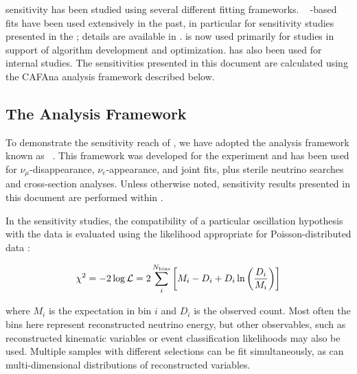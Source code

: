  sensitivity has been studied using several different fitting frameworks. ~\cite{Huber:2004ka,Huber:2007ji} 
-based fits have been used extensively in the past, in particular for sensitivity studies presented in the  ; details are available in \cite{Acciarri:2015uup,Alion:2016uaj,Bass:2014vta}.  is now used primarily for studies in support of algorithm development and optimization. \cite{valorweb} has also been used for internal studies.  The sensitivities presented in this document are calculated using the CAFAna analysis framework described below. 



\subsection{The  Analysis Framework}
\label{sect:methods-cafana}

To demonstrate the sensitivity reach of , we have adopted the analysis framework known as ~\cite{CAFAna}. This framework was developed for the  experiment and has been used for $\nu_\mu$-disappearance, $\nu_e$-appearance, and joint fits, plus sterile neutrino searches and cross-section analyses.  Unless otherwise noted, sensitivity results presented in this document are performed within . %

In the sensitivity studies, the compatibility of a particular oscillation hypothesis with the data is evaluated using the likelihood appropriate for Poisson-distributed data \cite{Tanabashi:2018oca}:

\begin{equation}
    \chi^2 = -2\log\mathcal{L} = 2\sum_i^{N_{\rm bins}}\left[ M_i-D_i+D_i\ln\left({D_i\over M_i}\right) \right]
\end{equation}

where $M_i$ is the  %
expectation in bin $i$ and $D_i$ is the observed count. Most often the bins here represent reconstructed neutrino energy, but other observables, such as reconstructed kinematic variables or event classification likelihoods may also be used. Multiple samples with different selections can be fit simultaneously, as can multi-dimensional distributions of reconstructed variables.

